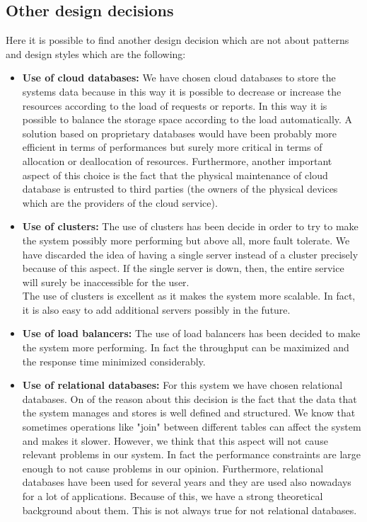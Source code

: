 \documentclass[titlepage]{article}
\begin{document}
\subsection{Other design decisions}
Here it is possible to find another design decision which are not about patterns and design styles which are the following:
\begin{itemize}
	\item \textbf{ Use of cloud databases:} We have chosen cloud databases to store the systems data because in this way it is possible to decrease or increase the resources according to the load of requests or reports. In this way it is possible to balance the storage space according to the load automatically. A solution based on proprietary databases would have been probably more efficient in terms of performances but surely more critical in terms of allocation or deallocation of resources. Furthermore, another important aspect of this choice is the fact that the physical maintenance of cloud database is entrusted to third parties (the owners of the physical devices which are the providers of the cloud service).
	\item \textbf{Use of clusters:} The use of clusters has been decide in order to try to make the system possibly more performing but above all, more fault tolerate. We have discarded the idea of having a single server instead of a cluster precisely because of this aspect. If the single server is down, then, the entire service will surely be inaccessible for the user. \\
The use of clusters is excellent as it makes the system more scalable. In fact, it is also easy to add additional servers possibly in the future.
	\item \textbf{Use of load balancers:} The use of load balancers has been decided to make the system more performing. In fact the throughput can be maximized and the response time minimized considerably. 
	\item \textbf{Use of relational databases:} For this system we have chosen relational databases. On of the reason about this decision is the fact that the data that the system manages and stores is well defined and structured. We know that sometimes operations like "join" between different tables can affect the system and makes it slower. However, we think that this aspect will not cause relevant problems in our system. In fact the performance constraints are large enough to not cause problems in our opinion. Furthermore, relational databases have been used for several years and they are used also nowadays for a lot of applications. Because of this, we have a strong theoretical background about them. This is not always true for not relational databases.
	
\end{itemize}
\end{document}
